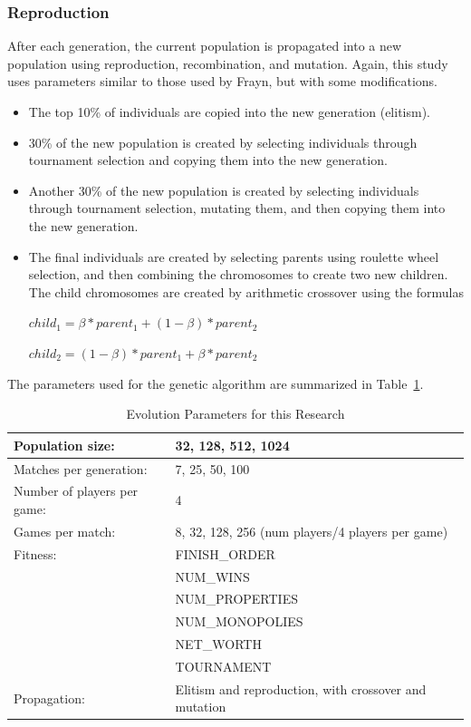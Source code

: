 \subsubsection{Reproduction}

After each generation, the current population is propagated into a new
population using reproduction, recombination, and mutation. Again, this study
uses parameters similar to those used by Frayn, but with some modifications.

\begin{itemize}
  \item {The top 10\% of individuals are copied into the new generation
  (elitism).}
  \item {30\% of the new population is created by selecting individuals through
  tournament selection and copying them into the new generation.}
  \item {Another 30\% of the new population is created by selecting individuals
  through tournament selection, mutating them, and then copying them into the new
  generation.}
  \item {The final individuals are created by selecting parents using
  roulette wheel selection, and then combining the chromosomes to create two
  new children. The child chromosomes are created by arithmetic crossover using
  the formulas 
  
  \(child_{1} = \beta * parent_{1} + (1 - \beta ) * parent_{2}\)

  \(child_{2} = (1 - \beta ) * parent_{1} + \beta * parent_{2}\)}
\end{itemize}

The parameters used for the genetic algorithm are summarized in
Table~\ref{table-evoparams}.

\begin{table}[ht]
\caption{Evolution Parameters for this Research}
\begin{center}
\begin{tabular}{ | l | l | }
  \hline                        
  Population size: & 32, 128, 512, 1024 \\ \hline
  Matches per generation: & 7, 25, 50, 100 \\ \hline
  Number of players per game: & 4 \\ \hline
  Games per match: & 8, 32, 128, 256 (num players/4 players per game) \\ \hline
  Fitness: & FINISH\_ORDER \\ 
           & NUM\_WINS \\
           & NUM\_PROPERTIES \\ 
           & NUM\_MONOPOLIES \\
           & NET\_WORTH \\ 
           & TOURNAMENT \\ \hline
  Propagation: & Elitism and reproduction, with crossover and mutation \\ \hline  
\end{tabular}
\label{table-evoparams}
\end{center}
\end{table}
